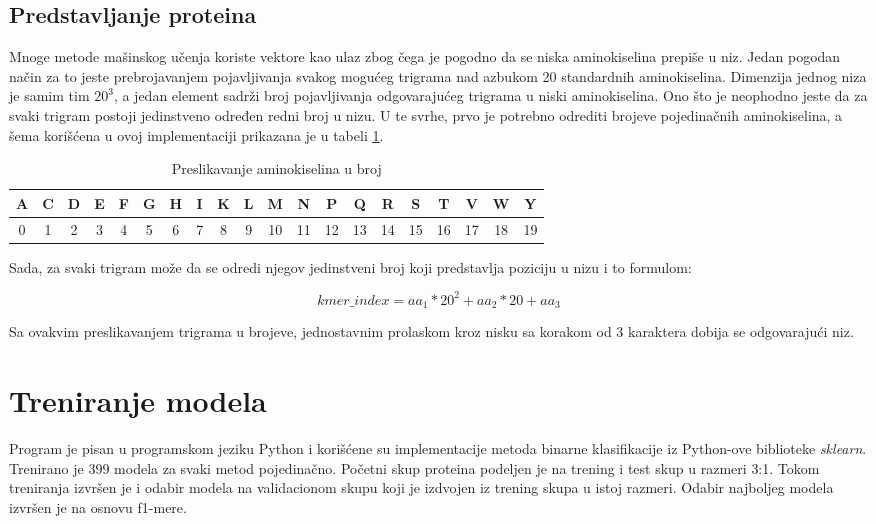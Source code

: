 \subsection{Predstavljanje proteina}
\label{subsec:proteins}

Mnoge metode mašinskog učenja koriste vektore kao ulaz zbog čega je pogodno da se niska aminokiselina prepiše u niz. Jedan pogodan način za to jeste prebrojavanjem pojavljivanja svakog mogućeg trigrama nad azbukom 20 standardnih aminokiselina. Dimenzija jednog niza je samim tim $20^3$, a jedan element sadrži broj pojavljivanja odgovarajućeg trigrama u niski aminokiselina. Ono što je neophodno jeste da za svaki trigram postoji jedinstveno određen redni broj u nizu. U te svrhe, prvo je potrebno odrediti brojeve pojedinačnih aminokiselina, a šema korišćena u ovoj implementaciji prikazana je u tabeli \ref{tab: aminosNumbers}.


\begin{table}[H]
	\centering
	\begin{tabular}{|c|c|c|c|c|c|c|c|c|c|c|c|c|c|c|c|c|c|c|c|}
		\hline
		A & C & D & E & F & G & H & I & K & L & M & N & P & Q & R & S & T & V & W & Y \\
		\hline
		0 & 1 & 2 & 3 & 4 & 5 & 6 & 7 & 8 & 9 & 10 & 11 & 12 & 13 & 14 & 15 & 16 & 17 & 18 & 19 \\
		\hline             
	\end{tabular}
	\caption{Preslikavanje aminokiselina u broj}
	\label{tab: aminosNumbers}
\end{table}

Sada, za svaki trigram može da se odredi njegov jedinstveni broj koji predstavlja poziciju u nizu i to formulom:

$$kmer\_index = aa_1*20^2 + aa_2 * 20 + aa_3$$

Sa ovakvim preslikavanjem trigrama u brojeve, jednostavnim prolaskom kroz nisku sa korakom od 3 karaktera dobija se odgovarajući niz.


\section{Treniranje modela}
\label{sec:train}


Program je pisan u programskom jeziku Python i korišćene su implementacije metoda binarne klasifikacije iz Python-ove biblioteke \textit{sklearn}. Trenirano je 399 modela za svaki metod pojedinačno. Početni skup proteina podeljen je na trening i test skup u razmeri 3:1. Tokom treniranja izvršen je i odabir modela na validacionom skupu koji je izdvojen iz trening skupa u istoj razmeri. Odabir najboljeg modela izvršen je na osnovu f1-mere.

